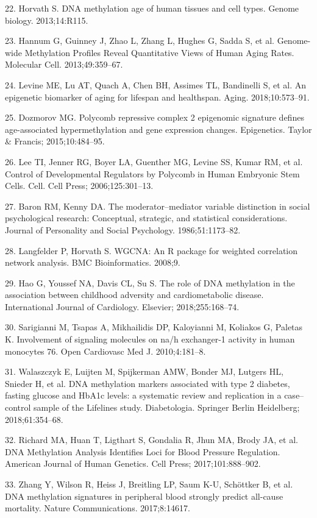 \documentclass[]{bmcart}
\theoremstyle{definition}
\theoremstyle{definition}
\theoremstyle{definition}
\theoremstyle{remark}
\begin{document}
22. Horvath S. DNA methylation age of human tissues and cell types.
Genome biology. 2013;14:R115.

23. Hannum G, Guinney J, Zhao L, Zhang L, Hughes G, Sadda S, et al.
Genome-wide Methylation Profiles Reveal Quantitative Views of Human
Aging Rates. Molecular Cell. 2013;49:359--67.

24. Levine ME, Lu AT, Quach A, Chen BH, Assimes TL, Bandinelli S, et al.
An epigenetic biomarker of aging for lifespan and healthspan. Aging.
2018;10:573--91.

25. Dozmorov MG. Polycomb repressive complex 2 epigenomic signature
defines age-associated hypermethylation and gene expression changes.
Epigenetics. Taylor \& Francis; 2015;10:484--95.

26. Lee TI, Jenner RG, Boyer LA, Guenther MG, Levine SS, Kumar RM, et
al. Control of Developmental Regulators by Polycomb in Human Embryonic
Stem Cells. Cell. Cell Press; 2006;125:301--13.

27. Baron RM, Kenny DA. The moderator--mediator variable distinction in
social psychological research: Conceptual, strategic, and statistical
considerations. Journal of Personality and Social Psychology.
1986;51:1173--82.

28. Langfelder P, Horvath S. WGCNA: An R package for weighted
correlation network analysis. BMC Bioinformatics. 2008;9.

29. Hao G, Youssef NA, Davis CL, Su S. The role of DNA methylation in
the association between childhood adversity and cardiometabolic disease.
International Journal of Cardiology. Elsevier; 2018;255:168--74.

30. Sarigianni M, Tsapas A, Mikhailidis DP, Kaloyianni M, Koliakos G,
Paletas K. Involvement of signaling molecules on na/h exchanger-1
activity in human monocytes 76. Open Cardiovasc Med J. 2010;4:181--8.

31. Walaszczyk E, Luijten M, Spijkerman AMW, Bonder MJ, Lutgers HL,
Snieder H, et al. DNA methylation markers associated with type 2
diabetes, fasting glucose and HbA1c levels: a systematic review and
replication in a case--control sample of the Lifelines study.
Diabetologia. Springer Berlin Heidelberg; 2018;61:354--68.

32. Richard MA, Huan T, Ligthart S, Gondalia R, Jhun MA, Brody JA, et
al. DNA Methylation Analysis Identifies Loci for Blood Pressure
Regulation. American Journal of Human Genetics. Cell Press;
2017;101:888--902.

33. Zhang Y, Wilson R, Heiss J, Breitling LP, Saum K-U, Sch{ö}ttker B,
et al. DNA methylation signatures in peripheral blood strongly predict
all-cause mortality. Nature Communications. 2017;8:14617.
\end{document}
